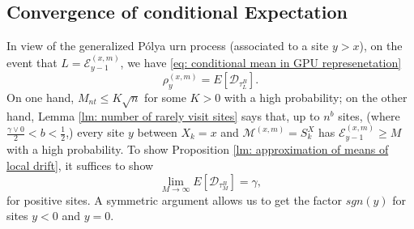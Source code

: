 \documentclass[twoside,12pt,a4paper]{article}
\numberwithin{equation}{section}
\begin{document}
{\subsection{Convergence of conditional Expectation}
In view of the generalized P\'{o}lya urn process (associated to a site $y> x$), on the event that $ L = \mathcal{E}^{(x,m)}_{y-1}$, we have \eqref{eq: conditional mean in GPU represenetation} 
$$\rho^{(x,m)}_y = E[\mathcal{D}_{\tau_L^B}].$$ 
On one hand, $M_{nt} \leq K\sqrt{n} $ for some $K>0$ with a high probability; on the other hand, Lemma \ref{lm: number of rarely visit sites} says that, up to $n^b$ sites, (where $\frac{\gamma \vee 0}{2}<b<\frac{1}{2}$,) every site $y$ between $X_k=x$ and $\mathcal{M}^{(x,m)} =S_{k}^X$ has $ \mathcal{E}^{(x,m)}_{y-1} \geq M  $ with a high probability. To show Proposition \ref{lm: approximation of means of local drift}, it suffices to show 
\begin{equation}\label{eq: convergence of conditional expectation}
	\lim_{M\to\infty} E[\mathcal{D}_{\tau_M^B}] = \gamma , 
\end{equation} for positive sites. A symmetric argument allows us to get the factor $sgn(y)$ for sites $y<0$ and $y=0$.

}
\end{document}
